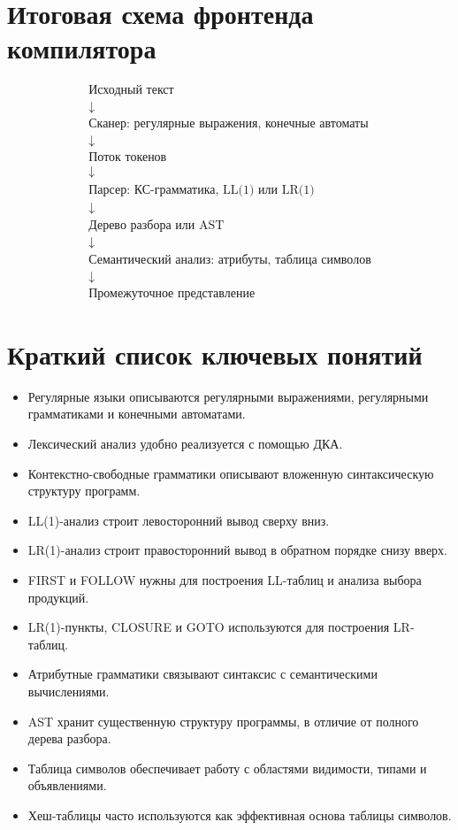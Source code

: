\documentclass[12pt,a4paper]{article}
\begin{document}
\section{Итоговая схема фронтенда компилятора}

\[
\begin{array}{c}
\text{Исходный текст} \\
\downarrow \\
\text{Сканер: регулярные выражения, конечные автоматы} \\
\downarrow \\
\text{Поток токенов} \\
\downarrow \\
\text{Парсер: КС-грамматика, LL(1) или LR(1)} \\
\downarrow \\
\text{Дерево разбора или AST} \\
\downarrow \\
\text{Семантический анализ: атрибуты, таблица символов} \\
\downarrow \\
\text{Промежуточное представление}
\end{array}
\]

\section{Краткий список ключевых понятий}

\begin{itemize}
    \item Регулярные языки описываются регулярными выражениями, регулярными грамматиками и конечными автоматами.
    \item Лексический анализ удобно реализуется с помощью ДКА.
    \item Контекстно-свободные грамматики описывают вложенную синтаксическую структуру программ.
    \item LL(1)-анализ строит левосторонний вывод сверху вниз.
    \item LR(1)-анализ строит правосторонний вывод в обратном порядке снизу вверх.
    \item FIRST и FOLLOW нужны для построения LL-таблиц и анализа выбора продукций.
    \item LR(1)-пункты, CLOSURE и GOTO используются для построения LR-таблиц.
    \item Атрибутные грамматики связывают синтаксис с семантическими вычислениями.
    \item AST хранит существенную структуру программы, в отличие от полного дерева разбора.
    \item Таблица символов обеспечивает работу с областями видимости, типами и объявлениями.
    \item Хеш-таблицы часто используются как эффективная основа таблицы символов.
\end{itemize}
\end{document}
